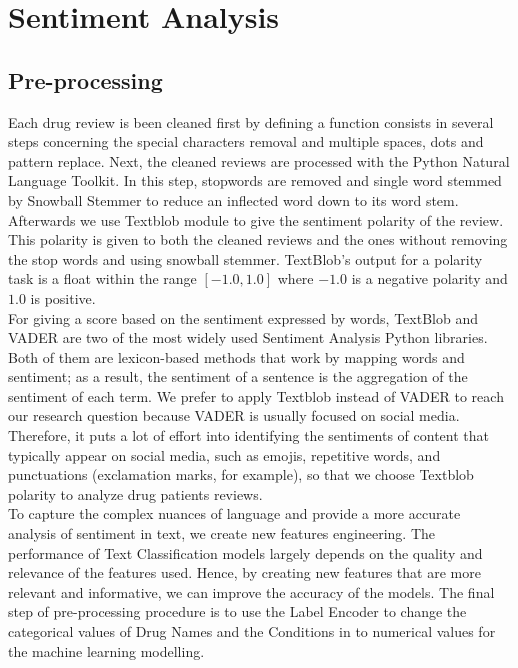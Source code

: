 \documentclass[10pt, a4paper, twocolumn]{article}
\begin{document}
            
    \section{Sentiment Analysis}
      
            
        \subsection{Pre-processing}
         Each drug review is been cleaned first by defining a function consists in several steps concerning the special characters removal and multiple spaces, dots and pattern replace. Next, the cleaned reviews are processed with the Python Natural Language Toolkit. In this step, stopwords are removed and single word stemmed by Snowball Stemmer to reduce an inflected word down to its word stem. Afterwards we use Textblob module to give the sentiment polarity of the review. This polarity is given to both the cleaned reviews and the ones without removing the stop words and using snowball stemmer. TextBlob’s output for a polarity task is a float within the range $[-1.0, 1.0]$ where $-1.0$ is a negative polarity and $1.0$ is positive.\\ 
         For giving a score based on the sentiment expressed by words, TextBlob and VADER are two of the most widely used Sentiment Analysis Python libraries. Both of them are lexicon-based methods that work by mapping words and sentiment; as a result, the sentiment of a sentence is the aggregation of the sentiment of each term.
         We prefer to apply Textblob instead of VADER to reach our research question because VADER is usually focused on social media. Therefore, it puts a lot of effort into identifying the sentiments of content that typically appear on social media, such as emojis, repetitive words, and punctuations (exclamation marks, for example), so that we choose Textblob polarity to analyze drug patients reviews.\\
         To capture the complex nuances of language and provide a more accurate analysis of sentiment in text, we create new features engineering. The performance of Text Classification models largely depends on the quality and relevance of the features used. Hence, by creating new features that are more relevant and informative, we can improve the accuracy of the models.
         The final step of pre-processing procedure is to use the Label Encoder to change the categorical values of Drug Names and the Conditions in to numerical values for the machine learning modelling.
 
\end{document}
